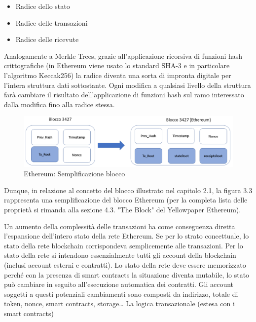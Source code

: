 \begin{itemize}
\item Radice dello stato
\item Radice delle transazioni
\item Radice delle ricevute
\end{itemize}

Analogamente a Merkle Trees, grazie all'applicazione ricorsiva di funzioni hash crittografiche (in Ethereum viene usato lo standard SHA-3 e in particolare l'algoritmo Keccak256) la radice diventa una sorta di impronta digitale per l'intera struttura dati sottostante. Ogni modifica a qualsiasi livello della struttura farà cambiare il risultato dell'applicazione di funzioni hash sul ramo interessato dalla modifica fino alla radice stessa. 

\begin{figure}[H]
\centering
\includegraphics[width=1\textwidth]{immagini/EthBlockSimplified.png}
\caption{Ethereum: Semplificazione blocco}
\label{fig:EthBlock}
\end{figure}

Dunque, in relazione al concetto del blocco illustrato nel capitolo 2.1, la figura 3.3 rappresenta una semplificazione del blocco Ethereum (per la completa lista delle proprietà si rimanda alla sezione 4.3. "The Block" del Yellowpaper Ethereum).

Un aumento della complessità delle transazioni ha come conseguenza diretta l’espansione dell’intero stato della rete Ethereum. Se per lo strato concettuale, lo stato della rete blockchain corrispondeva semplicemente alle transazioni. 
Per lo stato della rete si intendono essenzialmente tutti gli account della blockchain (inclusi account esterni e contratti). Lo stato della rete deve essere memorizzato perché con la presenza di smart contracts la situazione diventa mutabile, lo stato può cambiare in seguito all’esecuzione automatica dei contratti. Gli account soggetti a questi potenziali cambiamenti sono composti da indirizzo, totale di token, nonce, smart contracts, storage… 
La logica transazionale (estesa con i smart contracts)

